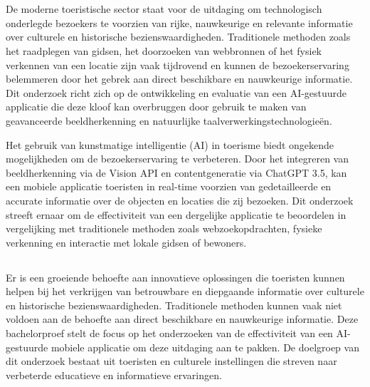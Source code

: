 
\chapter{}%
\label{ch:inleiding}

De moderne toeristische sector staat voor de uitdaging om technologisch onderlegde bezoekers te voorzien van rijke, nauwkeurige en relevante informatie over culturele en historische bezienswaardigheden. Traditionele methoden zoals het raadplegen van gidsen, het doorzoeken van webbronnen of het fysiek verkennen van een locatie zijn vaak tijdrovend en kunnen de bezoekerservaring belemmeren door het gebrek aan direct beschikbare en nauwkeurige informatie. Dit onderzoek richt zich op de ontwikkeling en evaluatie van een AI-gestuurde applicatie die deze kloof kan overbruggen door gebruik te maken van geavanceerde beeldherkenning en natuurlijke taalverwerkingstechnologieën.

Het gebruik van kunstmatige intelligentie (AI) in toerisme biedt ongekende mogelijkheden om de bezoekerservaring te verbeteren. Door het integreren van beeldherkenning via de Vision API en contentgeneratie via ChatGPT 3.5, kan een mobiele applicatie toeristen in real-time voorzien van gedetailleerde en accurate informatie over de objecten en locaties die zij bezoeken. Dit onderzoek streeft ernaar om de effectiviteit van een dergelijke applicatie te beoordelen in vergelijking met traditionele methoden zoals webzoekopdrachten, fysieke verkenning en interactie met lokale gidsen of bewoners.

\section{}%
\label{sec:probleemstelling}

Er is een groeiende behoefte aan innovatieve oplossingen die toeristen kunnen helpen bij het verkrijgen van betrouwbare en diepgaande informatie over culturele en historische bezienswaardigheden. Traditionele methoden kunnen vaak niet voldoen aan de behoefte aan direct beschikbare en nauwkeurige informatie. Deze bachelorproef stelt de focus op het onderzoeken van de effectiviteit van een AI-gestuurde mobiele applicatie om deze uitdaging aan te pakken. De doelgroep van dit onderzoek bestaat uit toeristen en culturele instellingen die streven naar verbeterde educatieve en informatieve ervaringen.

